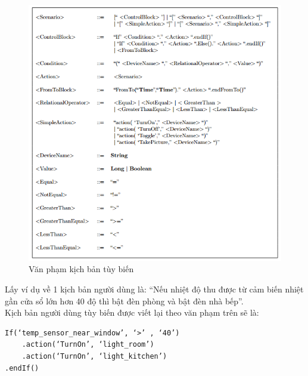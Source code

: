 \documentclass[12pt,a4paper,oneside]{extbook}
\begin{document}
\begin{figure}[h!]
  \centering
     \includegraphics[width=16cm]{6-user-grammar}
  \caption{Văn phạm kịch bản tùy biến}\label{fig:6-user-grammar}
\end{figure}

\noindent
Lấy ví dụ về 1 kịch bản người dùng là: “Nếu nhiệt độ thu được từ cảm biến nhiệt gần cửa sổ lớn hơn 40 độ thì bật đèn phòng và bật đèn nhà bếp”.\\

\noindent
Kịch bản người dùng tùy biến được viết lại theo văn phạm trên sẽ là:
\begin{verbatim}
If(‘temp_sensor_near_window’, ‘>’ , ‘40’)
	.action(‘TurnOn’, ‘light_room’)
	.action(‘TurnOn’, ‘light_kitchen’)
.endIf()
\end{verbatim}
\end{document}

